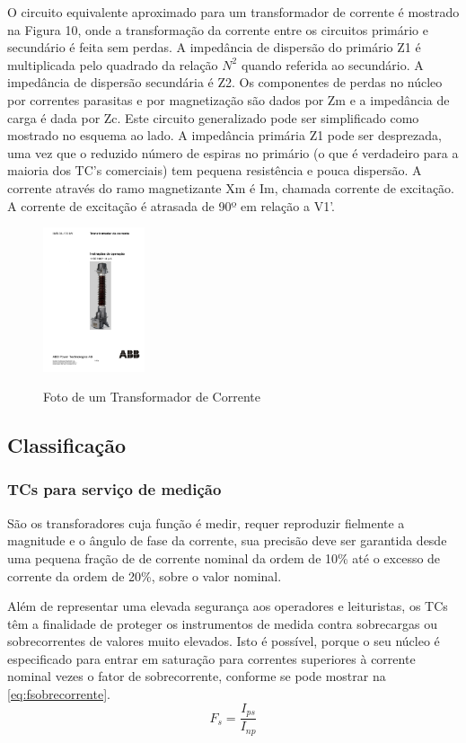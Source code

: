 \documentclass[a5paper,english,spanish,brazil]{ufsc-thesis}
\begin{document}
			O circuito equivalente aproximado para um transformador de corrente é mostrado na Figura 10, onde a transformação da corrente entre os circuitos primário e secundário é feita sem perdas. A impedância de dispersão do primário Z1 é multiplicada pelo quadrado da relação $N^{2}$ quando referida ao secundário. A impedância de dispersão secundária é Z2. Os componentes de perdas no núcleo por correntes parasitas e por magnetização são dados por Zm e a impedância de carga é dada por Zc. Este circuito generalizado pode ser simplificado como mostrado no esquema ao lado. A impedância primária Z1 pode ser desprezada, uma vez que o reduzido número de espiras no primário (o que é verdadeiro para a maioria dos TC’s comerciais) tem pequena resistência e pouca dispersão. A corrente através do ramo magnetizante Xm é Im, chamada corrente de excitação. A corrente de excitação é atrasada de 90º em relação a V1'.\par
			\begin{figure}[htb]
			  \caption{Foto de um Transformador de Corrente}
			  \centering
			  \includegraphics[width=3cm]{fototc.pdf}
			  \label{fig:fototc}
			\end{figure}

		\subsection{Classificação}
			\subsubsection{TCs para serviço de medição}
				São os transforadores cuja função é medir, requer reproduzir fielmente a magnitude e o ângulo de fase da corrente, sua precisão deve ser garantida desde uma pequena fração de de corrente nominal da ordem de 10\% até o excesso de corrente da ordem de 20\%, sobre o valor nominal.\cite{apuntesmeza}\par
				Além de representar uma elevada segurança aos operadores e leituristas, os TCs têm a finalidade de proteger os instrumentos de medida contra sobrecargas ou sobrecorrentes de valores muito elevados. Isto é possível, porque o seu núcleo é especificado para entrar em saturação para correntes superiores à corrente nominal vezes o fator de sobrecorrente, conforme se pode mostrar na \autoref{eq:fsobrecorrente}.
				\begin{equation} \label{eq:fsobrecorrente}
					F_{s} = \frac{I_{ps}}{I_{np}}
					\end{equation}
\end{document}
